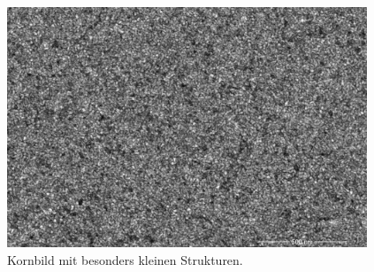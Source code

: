 \documentclass[
  12pt,
]{book}
\begin{document}
\begin{figure}

{\centering \includegraphics[width=0.96\textwidth]{../imgs/michel} 

}

\caption[Kornbild mit besonders kleinen Strukturen.]{Kornbild mit besonders kleinen Strukturen.}\label{fig:michelGrains}
\end{figure}
\end{document}

